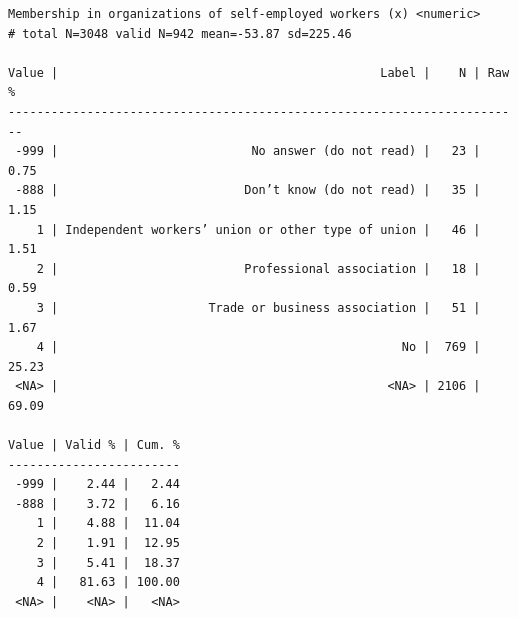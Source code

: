 \documentclass[
  letterpaper,
  DIV=11,
  numbers=noendperiod]{scrreprt}
\newenvironment{Shaded}{\begin{snugshade}}{\end{snugshade}}
\newcommand{\AttributeTok}[1]{\textcolor[rgb]{0.40,0.45,0.13}{#1}}
\newcommand{\DecValTok}[1]{\textcolor[rgb]{0.68,0.00,0.00}{#1}}
\newcommand{\FunctionTok}[1]{\textcolor[rgb]{0.28,0.35,0.67}{#1}}
\newcommand{\NormalTok}[1]{\textcolor[rgb]{0.00,0.23,0.31}{#1}}
\newcommand{\OtherTok}[1]{\textcolor[rgb]{0.00,0.23,0.31}{#1}}
\newcommand{\SpecialCharTok}[1]{\textcolor[rgb]{0.37,0.37,0.37}{#1}}
\newcommand{\StringTok}[1]{\textcolor[rgb]{0.13,0.47,0.30}{#1}}
\begin{document}
\begin{Shaded}
\end{Shaded}

\begin{verbatim}
Membership in organizations of self-employed workers (x) <numeric> 
# total N=3048 valid N=942 mean=-53.87 sd=225.46

Value |                                             Label |    N | Raw %
------------------------------------------------------------------------
 -999 |                           No answer (do not read) |   23 |  0.75
 -888 |                          Don’t know (do not read) |   35 |  1.15
    1 | Independent workers’ union or other type of union |   46 |  1.51
    2 |                          Professional association |   18 |  0.59
    3 |                     Trade or business association |   51 |  1.67
    4 |                                                No |  769 | 25.23
 <NA> |                                              <NA> | 2106 | 69.09

Value | Valid % | Cum. %
------------------------
 -999 |    2.44 |   2.44
 -888 |    3.72 |   6.16
    1 |    4.88 |  11.04
    2 |    1.91 |  12.95
    3 |    5.41 |  18.37
    4 |   81.63 | 100.00
 <NA> |    <NA> |   <NA>
\end{verbatim}

\begin{Shaded}
\end{Shaded}
\end{document}
